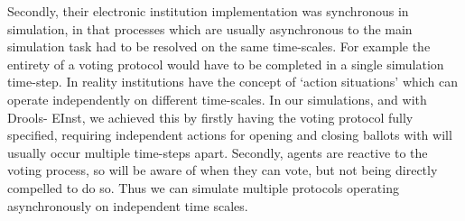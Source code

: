 Secondly, their electronic institution implementation was synchronous in
simulation, in that processes which are usually asynchronous to the main
simulation task had to be resolved on the same time-scales. For example the
entirety of a voting protocol would have to be completed in a single
simulation time-step. In reality institutions have the concept of `action
situations' which can operate independently on different time-scales. In our
simulations, and with Drools- EInst, we achieved this by firstly having the
voting protocol fully specified, requiring independent actions for opening and
closing ballots with will usually occur multiple time-steps apart. Secondly,
agents are reactive to the voting process, so will be aware of when they can
vote, but not being directly compelled to do so. Thus we can simulate multiple
protocols operating asynchronously on independent time scales.




